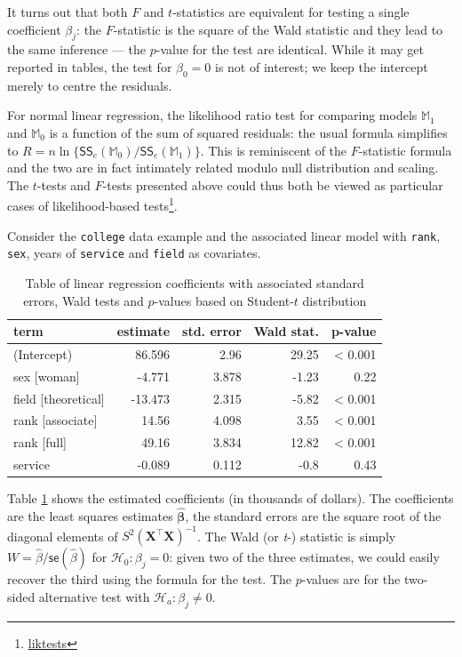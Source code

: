 \documentclass[
  11pt,
  letterpaper,
]{book}
\renewcommand{\href}[2]{#2\footnote{\url{#1}}}
\theoremstyle{definition}
\theoremstyle{definition}
\theoremstyle{definition}
\theoremstyle{remark}
\begin{document}
It turns out that both \(F\) and \(t\)-statistics are equivalent for testing a single coefficient \(\beta_j\): the \(F\)-statistic is the square of the Wald statistic and they lead to the same inference --- the \(p\)-value for the test are identical. While it may get reported in tables, the test for \(\beta_0=0\) is not of interest; we keep the intercept merely to centre the residuals.

For normal linear regression, the likelihood ratio test for comparing models \(\mathbb{M}_1\) and \(\mathbb{M}_0\) is a function of the sum of squared residuals: the usual formula simplifies to \(R = n\ln\{\mathsf{SS}_e(\mathbb{M}_0)/\mathsf{SS}_e(\mathbb{M}_1)\}\). This is reminiscent of the \(F\)-statistic formula and the two are in fact intimately related modulo null distribution and scaling. The \(t\)-tests and \(F\)-tests presented above could thus both be viewed as particular cases of \href{liktests}{likelihood-based tests}.

Consider the \texttt{college} data example and the associated linear model with \texttt{rank}, \texttt{sex}, years of \texttt{service} and \texttt{field} as covariates.

\begin{table}

\caption{\label{tab:summarytestslmcollege}Table of linear regression coefficients with associated standard errors, Wald tests and $p$-values based on Student-$t$ distribution}
\centering
\begin{tabular}[t]{lrrrr}
\toprule
term & estimate & std. error & Wald stat. & p-value\\
\midrule
(Intercept) & 86.596 & 2.96 & 29.25 & < 0.001\\
sex [woman] & -4.771 & 3.878 & -1.23 & 0.22\\
field [theoretical] & -13.473 & 2.315 & -5.82 & < 0.001\\
rank [associate] & 14.56 & 4.098 & 3.55 & < 0.001\\
rank [full] & 49.16 & 3.834 & 12.82 & < 0.001\\
\addlinespace
service & -0.089 & 0.112 & -0.8 & 0.43\\
\bottomrule
\end{tabular}
\end{table}

Table \ref{tab:summarytestslmcollege} shows the estimated coefficients (in thousands of dollars). The coefficients are the least squares estimates \(\widehat{\boldsymbol{\beta}}\), the standard errors are the square root of the diagonal elements of \(S^2(\mathbf{X}^\top\mathbf{X})^{-1}\). The Wald (or \emph{t}-) statistic is simply \(W=\widehat{\beta}/\mathsf{se}(\widehat{\beta})\) for \(\mathscr{H}_0: \beta_j=0\): given two of the three estimates, we could easily recover the third using the formula for the test. The \(p\)-values are for the two-sided alternative test with \(\mathscr{H}_a: \beta_j \neq 0\).
\end{document}

